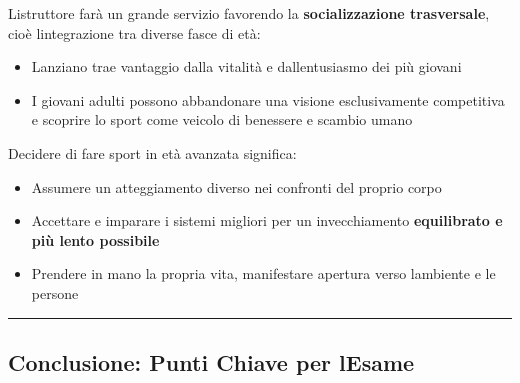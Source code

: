 \documentclass[a4paper,11pt]{article}
\providecommand{\tightlist}{%
  \setlength{\itemsep}{0pt}\setlength{\parskip}{0pt}}
\begin{document}
L\textquotesingle istruttore farà un grande servizio favorendo la
\textbf{socializzazione trasversale}, cioè
l\textquotesingle integrazione tra diverse fasce di età:

\begin{itemize}
      \tightlist
      \item
            L\textquotesingle anziano trae vantaggio dalla vitalità e
            dall\textquotesingle entusiasmo dei più giovani
      \item
            I giovani adulti possono abbandonare una visione esclusivamente
            competitiva e scoprire lo sport come veicolo di benessere e scambio
            umano
\end{itemize}

Decidere di fare sport in età avanzata significa:

\begin{itemize}
      \tightlist
      \item
            Assumere un atteggiamento diverso nei confronti del proprio corpo
      \item
            Accettare e imparare i sistemi migliori per un invecchiamento
            \textbf{equilibrato e più lento possibile}
      \item
            Prendere in mano la propria vita, manifestare apertura verso
            l\textquotesingle ambiente e le persone
\end{itemize}

\begin{center}\rule{0.5\linewidth}{0.5pt}\end{center}

\subsection{Conclusione: Punti Chiave per
      l\textquotesingle Esame}\label{conclusione-punti-chiave-per-lesame-2}
\end{document}

